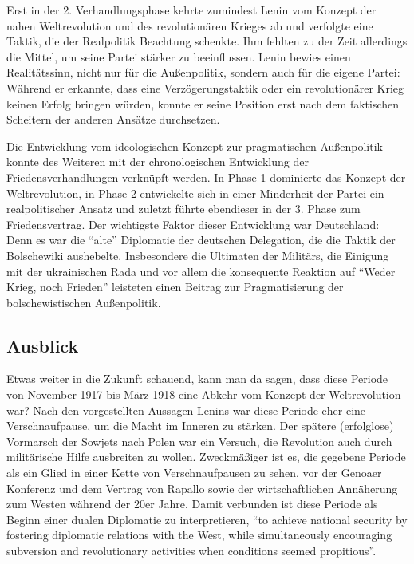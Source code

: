 \documentclass[12pt,headsepline,a4paper]{scrartcl}
\begin{document}
Erst in der 2. Verhandlungsphase kehrte zumindest Lenin vom Konzept der nahen Weltrevolution und des revolutionären Krieges ab und verfolgte eine Taktik, die der Realpolitik Beachtung schenkte. Ihm fehlten zu der Zeit allerdings die Mittel, um seine Partei stärker zu beeinflussen. Lenin bewies einen Realitätssinn, nicht nur für die Außenpolitik, sondern auch für die eigene Partei: Während er erkannte, dass eine Verzögerungstaktik oder ein revolutionärer Krieg keinen Erfolg bringen würden, konnte er seine Position erst nach dem faktischen Scheitern der anderen  Ansätze durchsetzen. 

Die Entwicklung vom ideologischen Konzept zur pragmatischen Außenpolitik konnte des Weiteren mit der chronologischen Entwicklung der Friedensverhandlungen verknüpft werden. In Phase 1 dominierte das Konzept der Weltrevolution, in Phase 2 entwickelte sich in einer Minderheit der Partei ein realpolitischer Ansatz und zuletzt führte ebendieser in der 3. Phase zum Friedensvertrag. Der wichtigste Faktor dieser Entwicklung war Deutschland: Denn es war die "`alte"' Diplomatie der deutschen Delegation, die die Taktik der Bolschewiki aushebelte. Insbesondere die Ultimaten der Militärs, die Einigung mit der ukrainischen Rada und vor allem die konsequente Reaktion auf "`Weder Krieg, noch Frieden"' leisteten einen Beitrag zur Pragmatisierung der bolschewistischen Außenpolitik.

\subsection*{Ausblick}
Etwas weiter in die Zukunft schauend, kann man da sagen, dass diese Periode von November 1917 bis März 1918 eine Abkehr vom Konzept der Weltrevolution war?
Nach den vorgestellten Aussagen Lenins war diese Periode eher eine Verschnaufpause, um die Macht im Inneren zu stärken. Der spätere (erfolglose) Vormarsch der Sowjets nach Polen war ein Versuch, die Revolution auch durch militärische  Hilfe ausbreiten zu wollen. Zweckmäßiger ist es, die gegebene Periode als ein Glied in einer Kette von Verschnaufpausen zu sehen, vor der Genoaer Konferenz und dem Vertrag von Rapallo sowie der wirtschaftlichen Annäherung zum Westen während der 20er Jahre\autocite[4]{goro1994_2}.
Damit verbunden ist diese Periode als Beginn einer dualen Diplomatie zu interpretieren, "`to achieve national security by fostering diplomatic relations with the West, while simultaneously encouraging subversion and revolutionary activities when conditions seemed propitious"'\autocite[33]{goro1994}.
\end{document}
